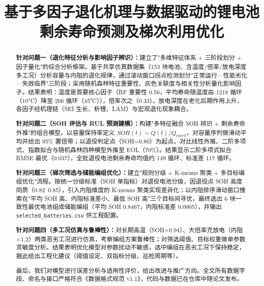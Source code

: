 \documentclass[withoutpreface]{cumcmthesis}
\title{基于多因子退化机理与数据驱动的锂电池剩余寿命预测及梯次利用优化}
\begin{document}
\maketitle

\begin{abstract}

\textbf{针对问题一（退化特征分析与影响因子辨识）：}建立了"多维特征体系 + 三阶段划分 + 因子量化"的综合分析框架。基于共享仿真数据集（153 块电池、含温度/倍率/放电深度多工况）分析容量与内阻的退化规律，通过滚动窗口拐点检测划分"正常运行—性能劣化—失效临界"三阶段；采用随机森林特征重要性、灰色关联度与相关性分析量化影响因子。结果表明：温度是首要核心因子（RF 重要性 0.56，平均寿命随温度由 1218 循环（10°C）降至 206 循环（45°C）），倍率次之（0.33），放电深度在老化后期作用上升，各因子经机理链（SEI 生长、析锂、LAM）与宏观退化现象耦合。

\textbf{针对问题二（SOH 评估与 RUL 预测建模）：}构建"多特征融合 SOH 辨识 + 剩余寿命外推"的组合模型。以容量保持率定义 $SOH(t)=Q(t)/Q_{rated}$，对容量序列做滑动平均并给出 95\% 置信带；以退役判定点（SOH=0.80）为起点，对比线性外推、二阶多项式、指数拟合与随机森林四种模型外推至 EOL（70\%）。结果显示二阶多项式拟合 RMSE 最优（0.037），全批退役电池剩余寿命均值约 149 循环、标准差 117 循环。

\textbf{针对问题三（梯次筛选与储能编组优化）：}建立"规则分级 + K-means 聚类 + 多目标编组优化"流程。按统一分级标准（SOH 单指标）对退役电池分级，因退役点 SOH 高度同质（0.82~0.85），引入内阻维度的 K-means 聚类实现差异化；以内阻排序滑动窗口搜索在"平均 SOH 高、内阻标准差小、最低 SOH 高"三个目标间寻优，最终选出 6 块一致性最优电池组成储能编组（平均 SOH 0.8467，内阻标准差 0.0005），并输出 \texttt{selected\_batteries.csv} 供工程配置。

\textbf{针对问题四（多工况仿真与鲁棒性）：}对长期高温（SOH×0.94）、大倍率充放电（内阻×1.2）两类恶劣工况进行仿真，考察编组方案鲁棒性；对筛选阈值、目标权重做单参数灵敏度分析。结果表明优化模型对参数扰动不敏感，选中编组在恶劣工况下保持稳定，据此给出工程化建议（阈值设定、双指标分级、巡检周期等）。

最后，我们对模型进行误差分析与适用性评价，给出改进与推广方向。全文所有数据字段、命名与接口严格符合《数据格式规范 v1.1》，代码与数据已在仓库中随论文发布。


\end{abstract}

\end{document}

